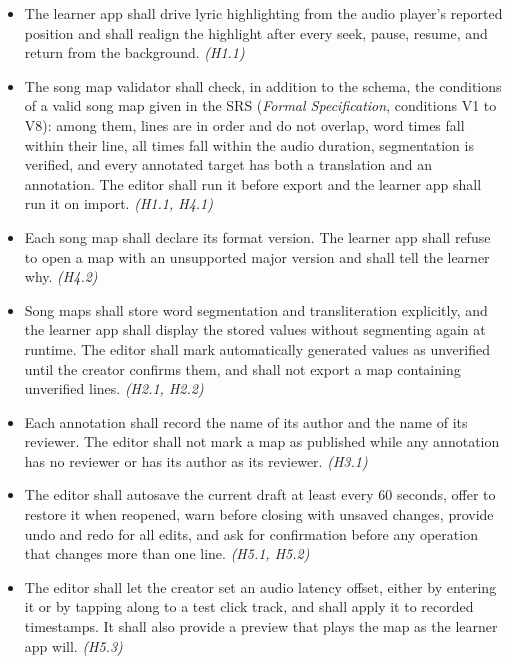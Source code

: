 \documentclass{article}
\begin{document}
\begin{itemize}
  \item[IN1.] The learner app shall drive lyric highlighting from the audio
        player's reported position and shall realign the highlight after
        every seek, pause, resume, and return from the background.
        \emph{(H1.1)}
  \item[IN2.] The song map validator shall check, in addition to the schema,
        the conditions of a valid song map given in the SRS
        (\emph{Formal Specification}, conditions V1 to V8): among them, lines
        are in order and do not overlap, word times fall within their line,
        all times fall within the audio duration, segmentation is verified,
        and every annotated target has both a translation and an annotation.
        The editor shall run it before export and the learner app shall run
        it on import.
        \emph{(H1.1, H4.1)}
  \item[IN3.] Each song map shall declare its format version. The learner app
        shall refuse to open a map with an unsupported major version and shall
        tell the learner why. \emph{(H4.2)}
  \item[IN4.] Song maps shall store word segmentation and transliteration
        explicitly, and the learner app shall display the stored values
        without segmenting again at runtime. The editor shall mark automatically
        generated values as unverified until the creator confirms them, and
        shall not export a map containing unverified lines.
        \emph{(H2.1, H2.2)}
  \item[IN5.] Each annotation shall record the name of its author and the
        name of its reviewer. The editor shall not mark a map as published
        while any annotation has no reviewer or has its author as its
        reviewer. \emph{(H3.1)}
  \item[IN6.] The editor shall autosave the current draft at least every 60
        seconds, offer to restore it when reopened, warn before closing with
        unsaved changes, provide undo and redo for all edits, and ask for
        confirmation before any operation that changes more than one line.
        \emph{(H5.1, H5.2)}
  \item[IN7.] The editor shall let the creator set an audio latency offset,
        either by entering it or by tapping along to a test click track, and
        shall apply it to recorded timestamps. It shall also provide a preview
        that plays the map as the learner app will. \emph{(H5.3)}

\end{itemize}
\end{document}
